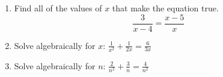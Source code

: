 \documentclass[12pt, twoside]{article}
\begin{document}
\begin{enumerate}[itemsep=0.5cm]
 \vspace{4cm}

\item Find all of the values of $x$ that make the equation true. 
$$\frac{3}{x-4} = \frac{x-5}{x}$$ \vspace{4cm}


\item Solve algebraically for $x$: $\displaystyle \frac{1}{x^2} + \frac{1}{2x} = \frac{6}{3x}$ 
\vspace{4cm}

\item Solve algebraically for $n$: $\displaystyle \frac{2}{n^2} + \frac{3}{n} = \frac{4}{n^2}$ %
        \vspace{4cm}


\end{enumerate}
\end{document}
